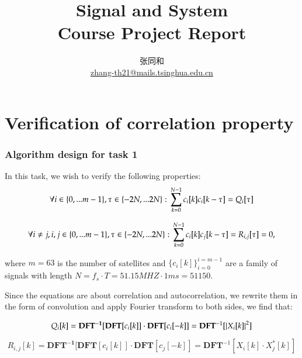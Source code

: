 \documentclass{article}
\title{\textbf{Signal and System \\ Course Project Report}}
\author{张同和\\ \href{zhang-th21@mails.tsinghua.edu.cn}{zhang-th21@mails.tsinghua.edu.cn}}
\affil{Dep.EE,Tsinghua University}
\begin{document}
\maketitle


\renewcommand\contentsname{Table of Contents}
\tableofcontents

\newpage

\part{\textbf{Verification of correlation property}}

\section{Algorithm design for task 1}
\par In this task, we wish to verify the following properties:
\begin{equation}
    \forall i \in \{0,...m-1\},\tau \in \{-2N,...2N\}:\\
    \sum_{k=0}^{N-1} c_i[k]c_i[k-\tau]=Q_{i}[\tau]
    \label{formula_auto}
\end{equation}

\begin{equation}
    \forall i \ne j, i,j \in \{0,...m-1\},\tau \in \{-2N,...2N\}:\\
    \sum_{k=0}^{N-1}c_{i}[k]c_j[k-\tau] =R_{i,j}[\tau]=0,
    \label{formula_corr}
\end{equation}

\par where $m=63$ is the number of satellites and 
$\{c_i[k]\}_{i=0}^{i=m-1}$ are a family of signals with length $N=f_s\cdot T=51.15MHZ\cdot 1ms=51150$.

\par Since the equations are about correlation and autocorrelation, we rewrite them in the form 
of convolution and apply Fourier transform to both sides, we find that:

\begin{equation}
    Q_{i}[k]=\mathbf{DFT^{-1}} [\mathbf{DFT}[c_i[k]]\cdot \mathbf{DFT}[c_i[-k]]=\mathbf{DFT}^{-1}[\abs{X_i[k]}^2] 
    \label{formula_fourier_analysis_auto}
\end{equation}

\begin{equation}
    R_{i,j}[k]=\mathbf{DFT^{-1}} [\mathbf{DFT}[c_i[k]]\cdot \mathbf{DFT}[c_j[-k]]=\mathbf{DFT}^{-1}[X_i[k]\cdot X_j^{*}[k]] 
    \label{formula_fourier_analysis_corr}
\end{equation}
\end{document}
